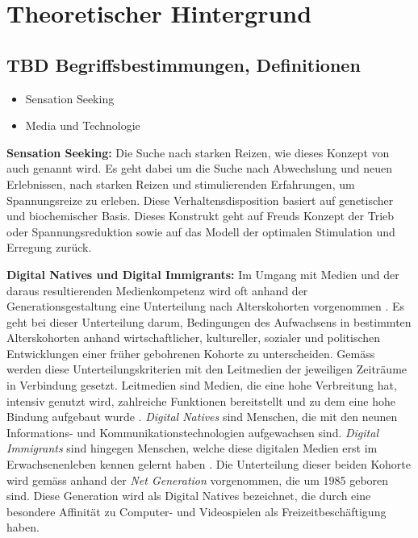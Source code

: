 \section{Theoretischer Hintergrund}\label{section.theoHintegrund}
\subsection{TBD Begriffsbestimmungen, Definitionen}
\label{subsection.begriffsbestimmung}
\begin{itemize}
    \item Sensation Seeking \cite{Zuckerman1994}
    \item Media und Technologie \cite{Lin20091}
\end{itemize}
\textbf{Sensation Seeking:}
Die Suche nach starken Reizen, wie dieses Konzept von  auch genannt wird. Es geht dabei um die Suche nach Abwechslung und neuen Erlebnissen, nach starken Reizen und stimulierenden Erfahrungen, um Spannungsreize zu erleben. Diese Verhaltensdisposition basiert auf genetischer und biochemischer Basis. Dieses Konstrukt geht auf Freuds Konzept der Trieb oder Spannungsreduktion sowie auf das Modell der optimalen Stimulation und Erregung zurück. 
\par
\textbf{Digital Natives und Digital Immigrants:} Im Umgang mit Medien und der daraus resultierenden Medienkompetenz wird oft anhand der Generationsgestaltung eine Unterteilung nach Alterskohorten vorgenommen \cite{Suss2013}. Es geht bei dieser Unterteilung darum, Bedingungen des Aufwachsens in bestimmten Alterskohorten anhand wirtschaftlicher, kultureller, sozialer und politischen Entwicklungen einer früher gebohrenen Kohorte zu unterscheiden. Gemäss  werden diese Unterteilungskriterien mit den Leitmedien der jeweiligen Zeiträume in Verbindung gesetzt. Leitmedien sind Medien, die eine hohe Verbreitung hat, intensiv genutzt wird, zahlreiche Funktionen bereitstellt und zu dem eine hohe Bindung aufgebaut wurde \cite{Suss2013}. \textit{Digital Natives} sind Menschen, die mit den neunen Informations- und Kommunikationstechnologien aufgewachsen sind. \textit{Digital Immigrants} sind hingegen Menschen, welche diese digitalen Medien erst im Erwachsenenleben kennen gelernt haben \cite{Prensky2001}. Die Unterteilung dieser beiden Kohorte wird gemäss  anhand der \textit{Net Generation} vorgenommen, die um 1985 geboren sind. Diese Generation wird als Digital Natives bezeichnet, die durch eine besondere Affinität zu Computer- und Videospielen als Freizeitbeschäftigung haben.
